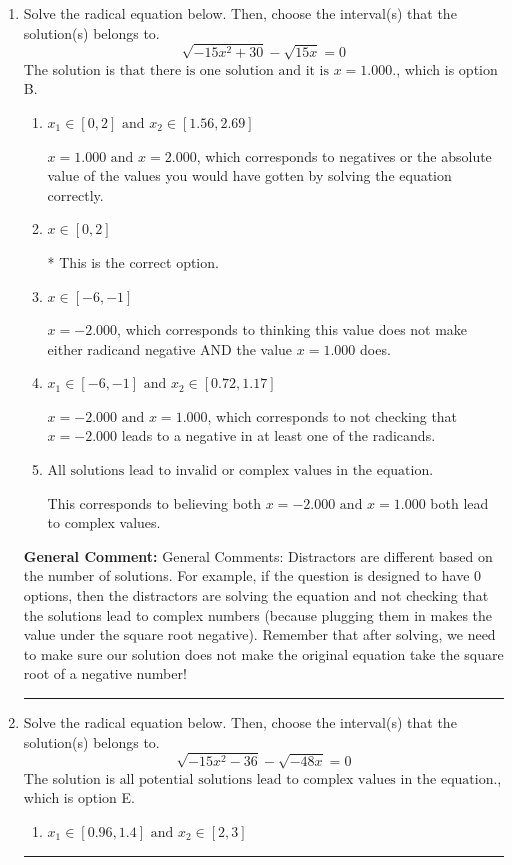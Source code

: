 \documentclass{extbook}[14pt]
\newcommand{\litem}[1]{\item #1

\rule{\textwidth}{0.4pt}}
\begin{document}
\begin{enumerate}\litem{
Solve the radical equation below. Then, choose the interval(s) that the solution(s) belongs to.
\[ \sqrt{-15 x^2 + 30} - \sqrt{15 x} = 0 \]
The solution is \( \text{that there is one solution and it is } x = 1.000. \), which is option B.\begin{enumerate}[label=\Alph*.]
\item \( x_1 \in [0, 2] \text{ and } x_2 \in [1.56,2.69] \)

$x = 1.000 \text{ and } x = 2.000$, which corresponds to negatives or the absolute value of the values you would have gotten by solving the equation correctly.
\item \( x \in [0,2] \)

* This is the correct option.
\item \( x \in [-6,-1] \)

$x = -2.000$, which corresponds to thinking this value does not make either radicand negative AND the value $x = 1.000$ does.
\item \( x_1 \in [-6, -1] \text{ and } x_2 \in [0.72,1.17] \)

$x = -2.000 \text{ and } x = 1.000$, which corresponds to not checking that $x = -2.000$ leads to a negative in at least one of the radicands.
\item \( \text{All solutions lead to invalid or complex values in the equation.} \)

This corresponds to believing both $x = -2.000 \text{ and } x = 1.000$ both lead to complex values.
\end{enumerate}

\textbf{General Comment:} General Comments: Distractors are different based on the number of solutions. For example, if the question is designed to have 0 options, then the distractors are solving the equation and not checking that the solutions lead to complex numbers (because plugging them in makes the value under the square root negative). Remember that after solving, we need to make sure our solution does not make the original equation take the square root of a negative number!
}
\litem{
Solve the radical equation below. Then, choose the interval(s) that the solution(s) belongs to.
\[ \sqrt{-15 x^2 - 36} - \sqrt{-48 x} = 0 \]
The solution is \( \text{all potential solutions lead to complex values in the equation.} \), which is option E.\begin{enumerate}[label=\Alph*.]
\item \( x_1 \in [0.96, 1.4] \text{ and } x_2 \in [2,3] \)


\end{enumerate}}
\end{enumerate}
\end{document}
